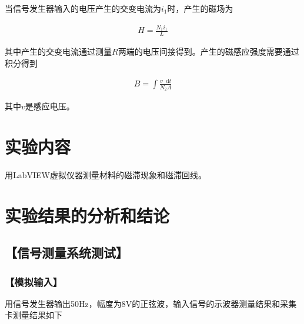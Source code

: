 \documentclass{ctexart}
\newcommand*{\md}{\mathop{}\!\mathrm{d}}   %
\let\oldsubsection\subsection
\renewcommand{\subsection}[1]{\oldsubsection{\!\!\!\!\!\!【#1】}}
\let\oldsubsubsection\subsubsection
\renewcommand{\subsubsection}[1]{\oldsubsubsection{\!\!\!\!\!\!【#1】}}
\begin{document}
当信号发生器输入的电压产生的交变电流为$i_1$时，产生的磁场为

\begin{equation*}
  \begin{aligned}
    H = \frac{N_1 i_1}{L}
  \end{aligned}
\end{equation*}

其中产生的交变电流通过测量$R$两端的电压间接得到。产生的磁感应强度需要通过积分得到

\begin{equation*}
  \begin{aligned}
    B = \int \frac{v\md t}{N_2 A}
  \end{aligned}
\end{equation*}

其中$v$是感应电压。

\section{实验内容}

用LabVIEW虚拟仪器测量材料的磁滞现象和磁滞回线。

\section{实验结果的分析和结论}

\subsection{信号测量系统测试}

\subsubsection{模拟输入}

用信号发生器输出50Hz，幅度为8V的正弦波，输入信号的示波器测量结果和采集卡测量结果如下
\end{document}
